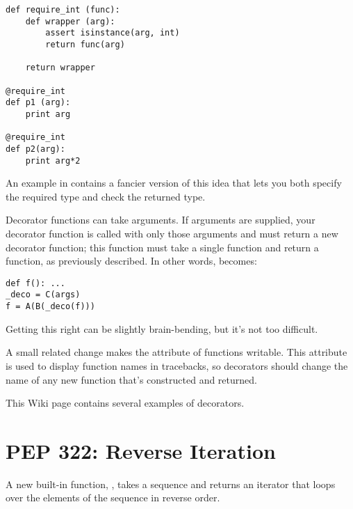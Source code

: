 \documentclass{howto}
\begin{document}
\begin{verbatim}
def require_int (func):
    def wrapper (arg):
        assert isinstance(arg, int)
        return func(arg)

    return wrapper

@require_int
def p1 (arg):
    print arg

@require_int
def p2(arg):
    print arg*2
\end{verbatim}

An example in  contains a fancier version of this idea that
lets you both specify the required type and check the returned type.

Decorator functions can take arguments.  If arguments are supplied,
your decorator function is called with only those arguments and must
return a new decorator function; this function must take a single
function and return a function, as previously described.  In other
words,  becomes:

\begin{verbatim}
def f(): ...
_deco = C(args)
f = A(B(_deco(f)))
\end{verbatim}

Getting this right can be slightly brain-bending, but it's not too
difficult.

A small related change makes the  attribute of
functions writable.  This attribute is used to display function names
in tracebacks, so decorators should change the name of any new
function that's constructed and returned.

\begin{seealso}

{This Wiki page contains several examples of decorators.}

\end{seealso}


\section{PEP 322: Reverse Iteration}

A new built-in function, , takes a sequence
and returns an iterator that loops over the elements of the sequence 
in reverse order.  
\end{document}
